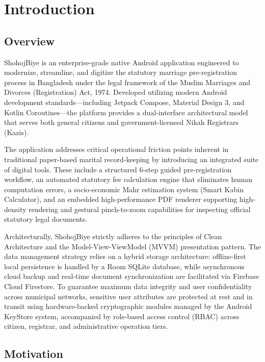 \documentclass[12pt,a4paper]{article}
\begin{document}
	\section{Introduction}
	
	\subsection{Overview}
	ShohojBiye is an enterprise-grade native Android application engineered to modernize, streamline, and digitize the statutory marriage pre-registration process in Bangladesh under the legal framework of the Muslim Marriages and Divorces (Registration) Act, 1974. Developed utilizing modern Android development standards---including Jetpack Compose, Material Design 3, and Kotlin Coroutines---the platform provides a dual-interface architectural model that serves both general citizens and government-licensed Nikah Registrars (Kazis).
	
	The application addresses critical operational friction points inherent in traditional paper-based marital record-keeping by introducing an integrated suite of digital tools. These include a structured 6-step guided pre-registration workflow, an automated statutory fee calculation engine that eliminates human computation errors, a socio-economic Mahr estimation system (Smart Kabin Calculator), and an embedded high-performance PDF renderer supporting high-density rendering and gestural pinch-to-zoom capabilities for inspecting official statutory legal documents.
	
	Architecturally, ShohojBiye strictly adheres to the principles of Clean Architecture and the Model-View-ViewModel (MVVM) presentation pattern. The data management strategy relies on a hybrid storage architecture: offline-first local persistence is handled by a Room SQLite database, while asynchronous cloud backup and real-time document synchronization are facilitated via Firebase Cloud Firestore. To guarantee maximum data integrity and user confidentiality across municipal networks, sensitive user attributes are protected at rest and in transit using hardware-backed cryptographic modules managed by the Android KeyStore system, accompanied by role-based access control (RBAC) across citizen, registrar, and administrative operation tiers.
	
	\subsection{Motivation}
	
\end{document}
